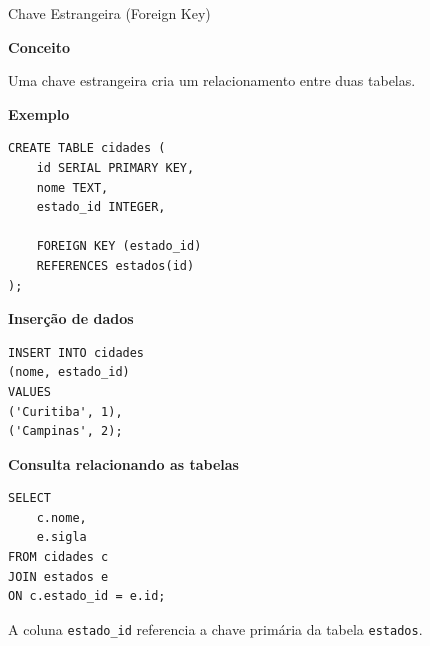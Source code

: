 \documentclass{beamer}
\begin{document}
\begin{frame}[fragile]{Chave Estrangeira (Foreign Key)}

\textbf{Conceito}

Uma chave estrangeira cria um relacionamento entre duas tabelas.

\vspace{0.3cm}

\textbf{Exemplo}

\begin{verbatim}
CREATE TABLE cidades (
    id SERIAL PRIMARY KEY,
    nome TEXT,
    estado_id INTEGER,

    FOREIGN KEY (estado_id)
    REFERENCES estados(id)
);
\end{verbatim}

\vspace{0.2cm}

\textbf{Inserção de dados}

\begin{verbatim}
INSERT INTO cidades
(nome, estado_id)
VALUES
('Curitiba', 1),
('Campinas', 2);
\end{verbatim}

\vspace{0.3cm}

\textbf{Consulta relacionando as tabelas}

\begin{verbatim}
SELECT
    c.nome,
    e.sigla
FROM cidades c
JOIN estados e
ON c.estado_id = e.id;
\end{verbatim}

\vspace{0.2cm}

A coluna \texttt{estado\_id} referencia a chave primária da tabela \texttt{estados}.

\end{frame}
\end{document}
